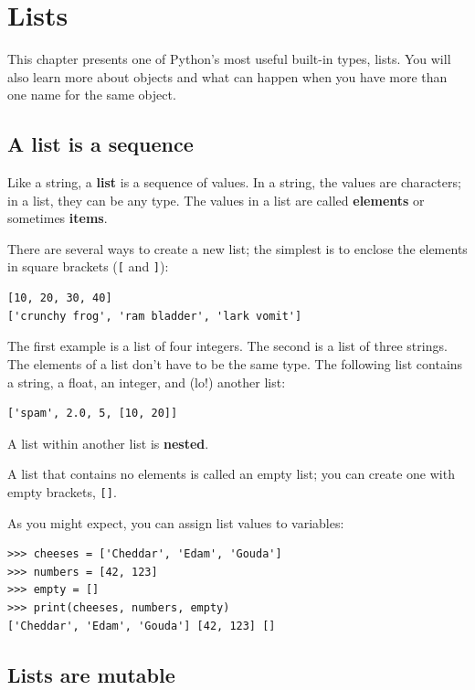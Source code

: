 \documentclass[10pt]{book}
\begin{document}
\chapter{Lists}

This chapter presents one of Python's most useful built-in types, lists.
You will also learn more about objects and what can happen when you have
more than one name for the same object.


\section{A list is a sequence}
\label{sequence}

Like a string, a {\bf list} is a sequence of values.  In a string, the
values are characters; in a list, they can be any type.  The values in
a list are called {\bf elements} or sometimes {\bf items}.

There are several ways to create a new list; the simplest is to
enclose the elements in square brackets (\verb"[" and \verb"]"):

\begin{verbatim}
[10, 20, 30, 40]
['crunchy frog', 'ram bladder', 'lark vomit']
\end{verbatim}
%
The first example is a list of four integers.  The second is a list of
three strings.  The elements of a list don't have to be the same type.
The following list contains a string, a float, an integer, and
(lo!) another list:

\begin{verbatim}
['spam', 2.0, 5, [10, 20]]
\end{verbatim}
%
A list within another list is {\bf nested}.

A list that contains no elements is
called an empty list; you can create one with empty
brackets, \verb"[]".

As you might expect, you can assign list values to variables:

\begin{verbatim}
>>> cheeses = ['Cheddar', 'Edam', 'Gouda']
>>> numbers = [42, 123]
>>> empty = []
>>> print(cheeses, numbers, empty)
['Cheddar', 'Edam', 'Gouda'] [42, 123] []
\end{verbatim}
%


\section{Lists are mutable}
\label{mutable}
\end{document}
